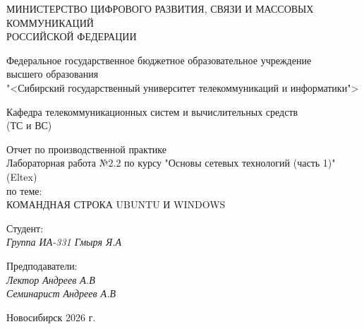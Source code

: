 \thispagestyle{empty}

\begin{center}
    МИНИСТЕРСТВО ЦИФРОВОГО РАЗВИТИЯ, СВЯЗИ И МАССОВЫХ КОММУНИКАЦИЙ \\ РОССИЙСКОЙ ФЕДЕРАЦИИ

    \vspace{20pt}

    Федеральное государственное бюджетное образовательное учреждение  \\  высшего образования \\
    "<Сибирский государственный университет телекоммуникаций и информатики"> \\

    \vspace{20pt}

    Кафедра телекоммуникационных систем и вычислительных средств \\  (ТС и ВС)
\end{center}

\vfill

\begin{center}
    Отчет по производственной практике \\  
    Лабораторная работа №2.2 по курсу "Основы сетевых технологий (часть 1)" (Eltex) \\
    \vspace{20pt}
    по теме: \\
    \uppercase{Командная строка Ubuntu и Windows}
\end{center}

\vfill

    \noindent Студент: \\
    \textit{Группа ИА-331 \hfill Гмыря Я.А}

    \vspace{20pt}

    \noindent Предподаватели: \\
    \textit{Лектор \hfill Андреев А.В} \\
    \textit{Семинарист \hfill Андреев А.В}

\vfill

\begin{center}
    Новосибирск 2026 г.
\end{center}